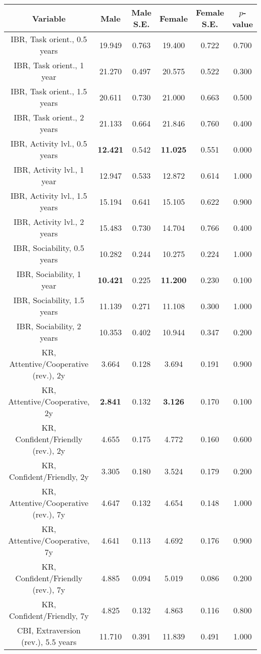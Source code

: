 \begin{longtable}{c c c c c c}
\toprule
\textbf{Variable} & \textbf{Male} & \textbf{Male S.E.}  & \textbf{Female} & \textbf{Female S.E.} & \textbf{$ p $-value} \\
\midrule
IBR, Task orient., 0.5 years & 19.949 & 0.763 &  19.400 & 0.722 & 0.700 \\
IBR, Task orient., 1 year & 21.270 & 0.497 &  20.575 & 0.522 & 0.300 \\
IBR, Task orient., 1.5 years & 20.611 & 0.730 &  21.000 & 0.663 & 0.500 \\
IBR, Task orient., 2 years & 21.133 & 0.664 &  21.846 & 0.760 & 0.400 \\
IBR, Activity lvl., 0.5 years & \textbf{12.421} & 0.542 &  \textbf{11.025} & 0.551 & 0.000 \\
IBR, Activity lvl., 1 year & 12.947 & 0.533 &  12.872 & 0.614 & 1.000 \\
IBR, Activity lvl., 1.5 years & 15.194 & 0.641 &  15.105 & 0.622 & 0.900 \\
IBR, Activity lvl., 2 years & 15.483 & 0.730 &  14.704 & 0.766 & 0.400 \\
IBR, Sociability, 0.5 years & 10.282 & 0.244 &  10.275 & 0.224 & 1.000 \\
IBR, Sociability, 1 year & \textbf{10.421} & 0.225 &  \textbf{11.200} & 0.230 & 0.100 \\
IBR, Sociability, 1.5 years & 11.139 & 0.271 &  11.108 & 0.300 & 1.000 \\
IBR, Sociability, 2 years & 10.353 & 0.402 &  10.944 & 0.347 & 0.200 \\
KR, Attentive/Cooperative (rev.), 2y & 3.664 & 0.128 &  3.694 & 0.191 & 0.900 \\
KR, Attentive/Cooperative, 2y & \textbf{2.841} & 0.132 &  \textbf{3.126} & 0.170 & 0.100 \\
KR, Confident/Friendly (rev.), 2y & 4.655 & 0.175 &  4.772 & 0.160 & 0.600 \\
KR, Confident/Friendly, 2y & 3.305 & 0.180 &  3.524 & 0.179 & 0.200 \\
KR, Attentive/Cooperative (rev.), 7y & 4.647 & 0.132 &  4.654 & 0.148 & 1.000 \\
KR, Attentive/Cooperative, 7y & 4.641 & 0.113 &  4.692 & 0.176 & 0.900 \\
KR, Confident/Friendly (rev.), 7y & 4.885 & 0.094 &  5.019 & 0.086 & 0.200 \\
KR, Confident/Friendly, 7y & 4.825 & 0.132 &  4.863 & 0.116 & 0.800 \\
CBI, Extraversion (rev.), 5.5 years & 11.710 & 0.391 &  11.839 & 0.491 & 1.000 \\

\end{longtable}
